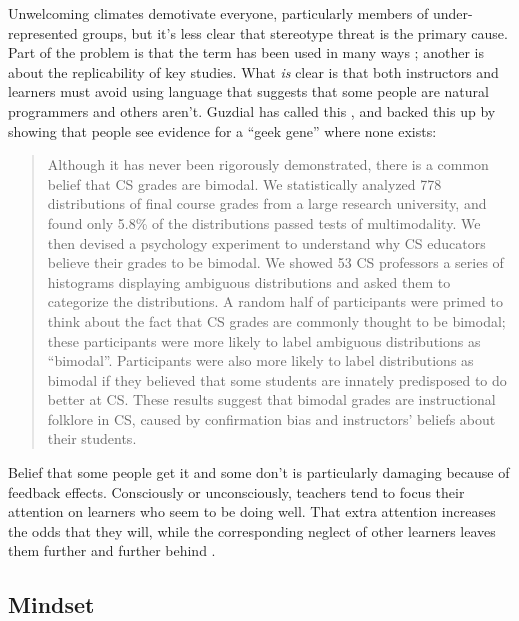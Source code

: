 Unwelcoming climates demotivate everyone, particularly members of
under-represented groups, but it's less clear that stereotype threat
is the primary cause. Part of the problem is that the term has been
used in many ways \cite{Shap2007}; another is
 about the replicability of
key studies. What \emph{is} clear is that both instructors and learners
must avoid using language that suggests that some people are natural
programmers and others aren't. Guzdial has called this , and
\cite{Pati2016} backed this up by showing that people see evidence
for a ``geek gene'' where none exists:

\begin{quote}

Although it has never been rigorously demonstrated, there is a common
belief that CS grades are bimodal. We statistically analyzed 778
distributions of final course grades from a large research university,
and found only 5.8\% of the distributions passed tests of
multimodality. We then devised a psychology experiment to understand
why CS educators believe their grades to be bimodal. We showed 53 CS
professors a series of histograms displaying ambiguous distributions
and asked them to categorize the distributions. A random half of
participants were primed to think about the fact that CS grades are
commonly thought to be bimodal; these participants were more likely to
label ambiguous distributions as ``bimodal''. Participants were also
more likely to label distributions as bimodal if they believed that
some students are innately predisposed to do better at CS. These
results suggest that bimodal grades are instructional folklore in CS,
caused by confirmation bias and instructors' beliefs about their
students.

\end{quote}

Belief that some people get it and some don't is particularly damaging
because of feedback effects. Consciously or unconsciously, teachers tend
to focus their attention on learners who seem to be doing well. That
extra attention increases the odds that they will, while the
corresponding neglect of other learners leaves them further and further
behind \cite{Alvi1999,Brop1983,Juss2005}.

\subsection*{Mindset}

